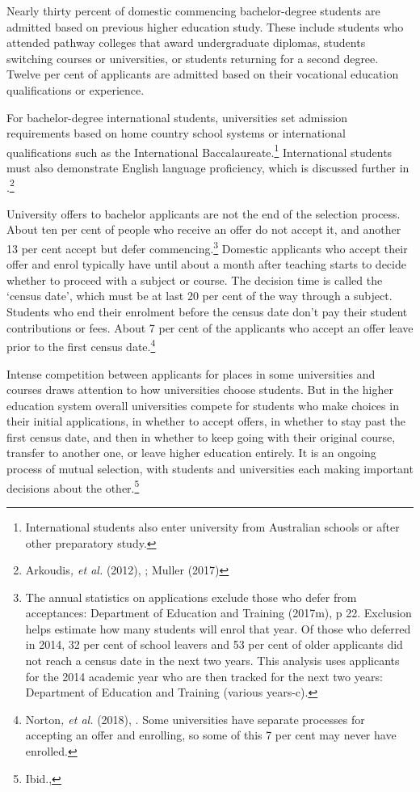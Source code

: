 \documentclass{grattan}
\begin{document}
Nearly thirty percent of domestic commencing bachelor-degree students are admitted based on previous higher education study. These include students who attended pathway colleges that award undergraduate diplomas, students switching courses or universities, or students returning for a second degree. Twelve per cent of applicants are admitted based on their vocational education qualifications or experience.

For bachelor-degree international students, universities set admission requirements based on home country school systems or international qualifications such as the International Baccalaureate.\footnote{International students also enter university from Australian schools or after other preparatory study.} International students must also demonstrate English language proficiency, which is discussed further in .\footnote{Arkoudis\emph{, et al.} (2012), ; Muller (2017)}

University offers to bachelor applicants are not the end of the selection process. About ten per cent of people who receive an offer do not accept it, and another 13 per cent accept but defer commencing.\footnote{The annual statistics on applications exclude those who defer from acceptances: Department of Education and Training (2017m), p 22. Exclusion helps estimate how many students will enrol that year. Of those who deferred in 2014, 32 per cent of school leavers and 53 per cent of older applicants did not reach a census date in the next two years. This analysis uses applicants for the 2014 academic year who are then tracked for the next two years: Department of Education and Training (various years-c).} Domestic applicants who accept their offer and enrol typically have until about a month after teaching starts to decide whether to proceed with a subject or course. The decision time is called the `census date', which must be at last 20 per cent of the way through a subject. Students who end their enrolment before the census date don't pay their student contributions or fees. About 7 per cent of the applicants who accept an offer leave prior to the first census date.\footnote{Norton\emph{, et al.} (2018), . Some universities have separate processes for accepting an offer and enrolling, so some of this 7 per cent may never have enrolled.}

Intense competition between applicants for places in some universities and courses draws attention to how universities choose students. But in the higher education system overall universities compete for students who make choices in their initial applications, in whether to accept offers, in whether to stay past the first census date, and then in whether to keep going with their original course, transfer to another one, or leave higher education entirely. It is an ongoing process of mutual selection, with students and universities each making important decisions about the other.\footnote{Ibid., }
\end{document}

